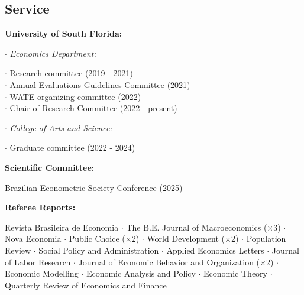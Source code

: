 \documentclass[mm, 10pt]{simple_style}
\begin{document}
\begin{resume}


\section{Service}

\textbf{University of South Florida:} 

$\cdot$ \indent \textit{Economics Department:} \\
\indent \hspace{1cm}  \begin{minipage}[t]{0.75\textwidth}
        $\cdot$ Research committee (2019 - 2021) \\
        $\cdot$ Annual Evaluations Guidelines Committee (2021) \\
        $\cdot$ WATE organizing committee (2022) \\
        $\cdot$ Chair of Research Committee (2022 - present)
        \end{minipage}

\clearpage
$\cdot$ \indent \textit{College of Arts and Science:} \\
\indent \hspace{1cm}  \begin{minipage}[t]{0.75\textwidth}
        $\cdot$ Graduate committee (2022 - 2024)  \\
        \end{minipage}

\textbf{Scientific Committee:} \\
\indent \hspace{1cm}  \begin{minipage}[t]{0.75\textwidth}
{\color{gray} Brazilian Econometric Society Conference (2025)}
\end{minipage}

\textbf{Referee Reports:} \\
\indent \hspace{1cm}  \begin{minipage}[t]{0.75\textwidth}
Revista Brasileira de Economia 
$\cdot$ The B.E. Journal of Macroeconomics ($\times$3) 
$\cdot$ Nova Economia 
$\cdot$ Public Choice ($\times$2) 
$\cdot$ World Development ($\times$2)
$\cdot$ Population Review 
$\cdot$ Social Policy and Administration 
$\cdot$ Applied Economics Letters 
$\cdot$ Journal of Labor Research
$\cdot$ Journal of Economic Behavior and Organization ($\times$2)
$\cdot$ Economic Modelling
$\cdot$ Economic Analysis and Policy
$\cdot$ Economic Theory
$\cdot$ Quarterly Review of Economics and Finance


\end{minipage}
\end{resume}
\end{document}
